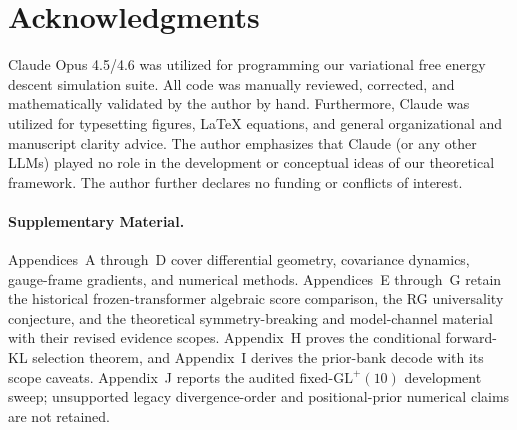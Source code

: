 \documentclass[twoside,11pt]{article}
\begin{document}
\section*{Acknowledgments}
Claude Opus 4.5/4.6 was utilized for programming our variational free energy descent simulation suite. All code was manually reviewed, corrected, and mathematically validated by the author by hand. Furthermore, Claude was utilized for typesetting figures, LaTeX equations, and general organizational and manuscript clarity advice. The author emphasizes that Claude (or any other LLMs) played no role in the development or conceptual ideas of our theoretical framework. The author further declares no funding or conflicts of interest.

\paragraph{Supplementary Material.} Appendices~A through~D cover differential geometry, covariance dynamics, gauge-frame gradients, and numerical methods. Appendices~E through~G retain the historical frozen-transformer algebraic score comparison, the RG universality conjecture, and the theoretical symmetry-breaking and model-channel material with their revised evidence scopes. Appendix~H proves the conditional forward-KL selection theorem, and Appendix~I derives the prior-bank decode with its scope caveats. Appendix~J reports the audited fixed-$\mathrm{GL}^+(10)$ development sweep; unsupported legacy divergence-order and positional-prior numerical claims are not retained.


\end{document}
